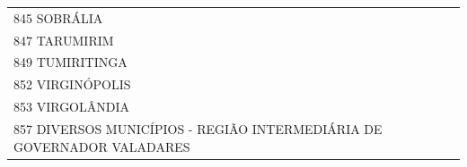 \documentclass{article}
\begin{document}
\begin{longtable}[c]{m{18cm}}
\multicolumn{1}{l}{ \hspace{2em} 845 SOBRÁLIA } \\
\multicolumn{1}{l}{ \hspace{2em} 847 TARUMIRIM } \\
\multicolumn{1}{l}{ \hspace{2em} 849 TUMIRITINGA } \\
\multicolumn{1}{l}{ \hspace{2em} 852 VIRGINÓPOLIS } \\
\multicolumn{1}{l}{ \hspace{2em} 853 VIRGOLÂNDIA } \\
\multicolumn{1}{l}{ \hspace{2em} 857 DIVERSOS MUNICÍPIOS - REGIÃO INTERMEDIÁRIA DE GOVERNADOR VALADARES } \\
\end{longtable}
\newpage
\end{document}
